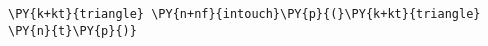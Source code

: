 \begin{Verbatim}[commandchars=\\\{\}]
    \PY{k+kt}{triangle} \PY{n+nf}{intouch}\PY{p}{(}\PY{k+kt}{triangle} \PY{n}{t}\PY{p}{)}
\end{Verbatim}
